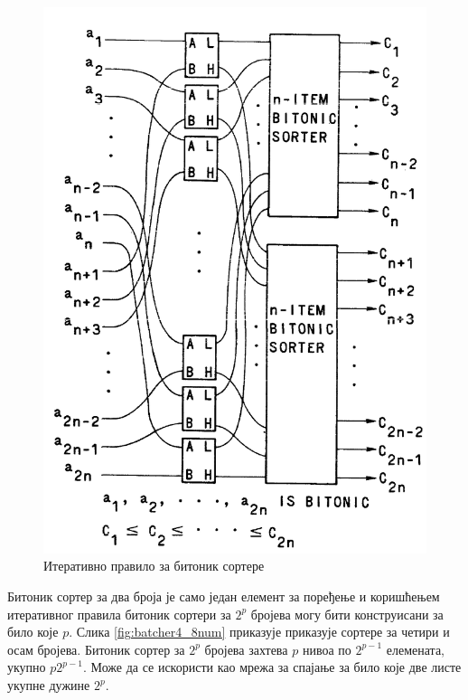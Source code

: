 \documentclass[12pt, a4paper]{article}
\theoremstyle{definition}
\begin{document}
\begin{figure}[H]
  \centering
      \includegraphics[scale=0.4]{slike/batcherIter}
  \caption{Итеративно правило за битоник сортере}
  \label{fig:batcherIter}
\end{figure}

Битоник сортер за два броја је само један елемент за поређење и коришћењем итеративног правила битоник сортери за $2^p$ бројева могу бити конструисани за било које $p$. Слика \ref{fig:batcher4_8num} приказује приказује сортере за четири и осам бројева. Битоник сортер за $2^p$ бројева захтева $p$ нивоа по $2^{p-1}$ елемената, укупно $p2^{p-1}$. Може да се искористи као мрежа за спајање за било које две листе укупне дужине $2^p$.
\end{document}
